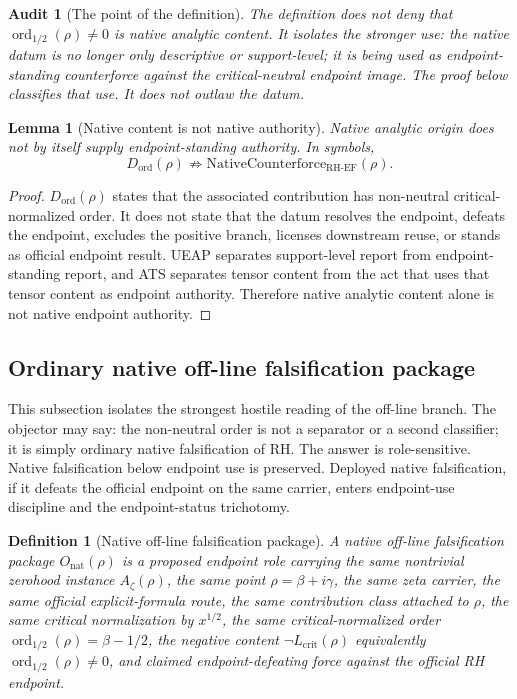 \documentclass[11pt]{article}
\newtheorem{definition}{Definition}[section]
\newtheorem{lemma}{Lemma}[section]
\newtheorem{audit}{Audit}[section]
\newcommand{\Az}{A_{\zeta}}
\newcommand{\Lcrit}{L_{\mathrm{crit}}}
\newcommand{\RH}{\mathrm{RH}}
\newcommand{\EF}{\mathrm{EF}}
\newcommand{\ordhalf}{\operatorname{ord}_{1/2}}
\newcommand{\Dord}{D_{\mathrm{ord}}}
\newcommand{\NativeCounterforce}{\mathrm{NativeCounterforce}}
\newcommand{\Onat}{O_{\mathrm{nat}}}
\begin{document}
\begin{audit}[The point of the definition]
The definition does not deny that \(\ordhalf(\rho)\ne0\) is native analytic content.  It isolates the stronger use: the native datum is no longer only descriptive or support-level; it is being used as endpoint-standing counterforce against the critical-neutral endpoint image.  The proof below classifies that use.  It does not outlaw the datum.
\end{audit}

\begin{lemma}[Native content is not native authority]
Native analytic origin does not by itself supply endpoint-standing authority.  In symbols,
\[
\Dord(\rho)\not\Rightarrow \NativeCounterforce_{\RH\text{-}\EF}(\rho).
\]
\end{lemma}

\begin{proof}
\(\Dord(\rho)\) states that the associated contribution has non-neutral critical-normalized order.  It does not state that the datum resolves the endpoint, defeats the endpoint, excludes the positive branch, licenses downstream reuse, or stands as official endpoint result.  UEAP separates support-level report from endpoint-standing report, and ATS separates tensor content from the act that uses that tensor content as endpoint authority.  Therefore native analytic content alone is not native endpoint authority.
\end{proof}


\subsection{Ordinary native off-line falsification package}

This subsection isolates the strongest hostile reading of the off-line branch.  The objector may say: the non-neutral order is not a separator or a second classifier; it is simply ordinary native falsification of RH.  The answer is role-sensitive.  Native falsification below endpoint use is preserved.  Deployed native falsification, if it defeats the official endpoint on the same carrier, enters endpoint-use discipline and the endpoint-status trichotomy.

\begin{definition}[Native off-line falsification package]
A native off-line falsification package \(\Onat(\rho)\) is a proposed endpoint role carrying the same nontrivial zerohood instance \(\Az(\rho)\), the same point \(\rho=\beta+i\gamma\), the same zeta carrier, the same official explicit-formula route, the same contribution class attached to \(\rho\), the same critical normalization by \(x^{1/2}\), the same critical-normalized order \(\ordhalf(\rho)=\beta-1/2\), the negative content \(\neg\Lcrit(\rho)\) equivalently \(\ordhalf(\rho)\ne0\), and claimed endpoint-defeating force against the official RH endpoint.
\end{definition}
\end{document}
